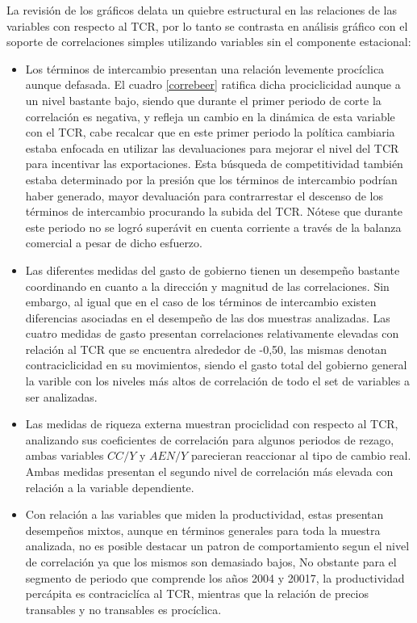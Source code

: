 \documentclass[12pt,letterpaper]{article}
\begin{document}
La revisión de los gráficos delata un quiebre estructural en las relaciones de las variables con respecto al TCR, por lo tanto se contrasta en análisis gráfico con el soporte de correlaciones simples utilizando variables sin el componente estacional:
\begin{itemize}
\item Los términos de intercambio presentan una relación levemente procíclica aunque defasada. El cuadro \ref{correbeer} ratifica dicha prociclicidad aunque a un nivel bastante bajo, siendo que durante el primer periodo de corte la correlación es negativa, y refleja un cambio en la dinámica de esta variable con el TCR, cabe recalcar que en este primer periodo la política cambiaria estaba enfocada en utilizar las devaluaciones para mejorar el nivel del TCR para incentivar las exportaciones. Esta búsqueda de competitividad también estaba determinado por la presión que los términos de intercambio podrían haber generado, mayor devaluación para contrarrestar el descenso de los términos de intercambio procurando la subida del TCR. Nótese que durante este periodo no se logró superávit en cuenta corriente a través de la balanza comercial a pesar de dicho esfuerzo.
\item Las diferentes medidas del gasto de gobierno tienen un desempeño bastante coordinando en cuanto a la dirección y magnitud de las correlaciones. Sin embargo, al igual que en el caso de los términos de intercambio existen diferencias asociadas en el desempeño de las dos muestras analizadas. Las cuatro medidas de gasto presentan correlaciones relativamente elevadas con relación al TCR que se encuentra alrededor de -0,50, las mismas denotan contraciclicidad en su movimientos, siendo el gasto total del gobierno general la varible con los niveles más altos de correlación de todo el set de variables a ser analizadas. 
\item  Las medidas de riqueza externa muestran  prociclidad con respecto al TCR, analizando sus coeficientes de correlación para algunos periodos de rezago, ambas variables $CC/Y$ y $AEN/Y$ parecieran reaccionar al tipo de cambio real. Ambas medidas presentan el segundo nivel de correlación más elevada con relación a la variable dependiente.
\item Con relación a las variables que miden la productividad, estas presentan desempeños mixtos, aunque en términos generales para toda la muestra analizada, no es posible destacar un patron de comportamiento segun el nivel de correlación ya que los mismos son demasiado bajos, No obstante para el segmento de periodo que comprende los años 2004 y 20017, la productividad percápita es contraciclíca al TCR, mientras que la relación de precios transables y no transables es procíclica.   
\end{itemize}
\end{document}
